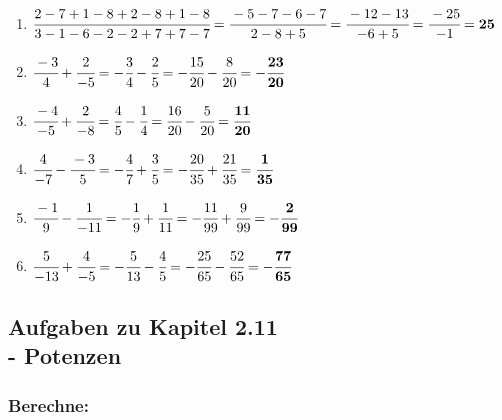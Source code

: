 \documentclass[a4paper,12pt]{article} %
\begin{document}
\begin{enumerate}
  \item \(\cfrac{2 - 7 + 1 - 8 + 2 - 8 + 1 - 8}{3 - 1 - 6 - 2 - 2 + 7 + 7 - 7} =
    \cfrac{-5 - 7 - 6 - 7}{2 - 8 + 5} = \cfrac{-12 - 13}{-6 + 5} = \cfrac{-25}{-1} = \mathbf{25}\) %

  \item \(\cfrac{-3}{4} + \cfrac{2}{-5} = -\cfrac{3}{4} - \cfrac{2}{5} = -\cfrac{15}{20} - \cfrac{8}{20} =
    \mathbf{-\cfrac{23}{20}}\) %

  \item \(\cfrac{-4}{-5} + \cfrac{2}{-8} = \cfrac{4}{5} - \cfrac{1}{4} = \cfrac{16}{20} - \cfrac{5}{20} =
    \mathbf{\cfrac{11}{20}}\) %

  \item \(\cfrac{4}{-7} - \cfrac{-3}{5} = -\cfrac{4}{7} + \cfrac{3}{5} = -\cfrac{20}{35} + \cfrac{21}{35} =
    \mathbf{\cfrac{1}{35}}\) %

  \item \(\cfrac{-1}{9} - \cfrac{1}{-11} = -\cfrac{1}{9} + \cfrac{1}{11} = -\cfrac{11}{99} + \cfrac{9}{99} =
    \mathbf{-\cfrac{2}{99}}\) %

  \item \(\cfrac{5}{-13} + \cfrac{4}{-5} = -\cfrac{5}{13} - \cfrac{4}{5} = -\cfrac{25}{65} - \cfrac{52}{65} =
    \mathbf{-\cfrac{77}{65}}\) %

\end{enumerate}

\subsection{Aufgaben zu Kapitel 2.11 \\
  - Potenzen}

\subsubsection{Berechne:} %
\end{document}
